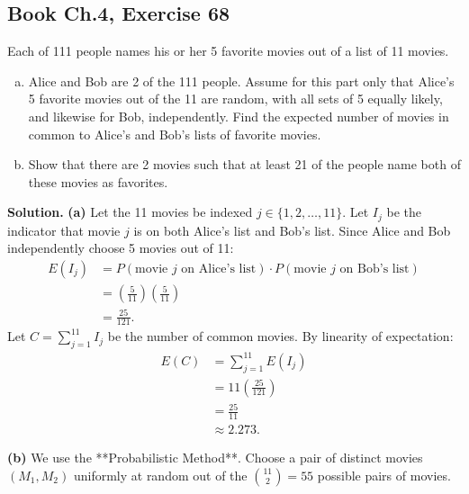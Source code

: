 \documentclass[11pt,a4paper]{article}
\begin{document}
\vspace{10pt}
\subsection{Book Ch.4, Exercise 68}
\begin{tcolorbox}[title={Book Ch.4, Exercise 68}]
Each of 111 people names his or her 5 favorite movies out of a list of 11 movies.
\begin{enumerate}[(a)]
\item Alice and Bob are 2 of the 111 people. Assume for this part only that Alice's 5 favorite movies out of the 11 are random, with all sets of 5 equally likely, and likewise for Bob, independently. Find the expected number of movies in common to Alice's and Bob's lists of favorite movies.
\item Show that there are 2 movies such that at least 21 of the people name both of these movies as favorites.
\end{enumerate}
\end{tcolorbox}

\noindent \textbf{Solution.} \textbf{(a)} Let the 11 movies be indexed $j \in \{1, 2, \dots, 11\}$. Let $I_j$ be the indicator that movie $j$ is on both Alice's list and Bob's list. Since Alice and Bob independently choose 5 movies out of 11:
\begin{align*}
E(I_j) &= P(\text{movie } j \text{ on Alice's list}) \cdot P(\text{movie } j \text{ on Bob's list}) \\
&= \left(\frac{5}{11}\right) \left(\frac{5}{11}\right) \\
&= \frac{25}{121}.
\end{align*}
Let $C = \sum_{j=1}^{11} I_j$ be the number of common movies. By linearity of expectation:
\begin{align*}
E(C) &= \sum_{j=1}^{11} E(I_j) \\
&= 11 \left(\frac{25}{121}\right) \\
&= \frac{25}{11} \\
&\approx 2.273.
\end{align*}

\vspace{4pt}
\noindent \textbf{(b)} We use the **Probabilistic Method**. Choose a pair of distinct movies $(M_1, M_2)$ uniformly at random out of the $\binom{11}{2} = 55$ possible pairs of movies. 
\end{document}
